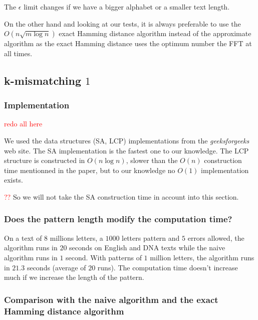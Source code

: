 \documentclass[preprint,12pt]{elsarticle}
\begin{document}
The $\epsilon$ limit changes if we have a bigger alphabet or a smaller text length.

On the other hand and looking at our tests,
it is always preferable to use the $O(n \sqrt{m \log n})$ exact Hamming distance algorithm
instead of the approximate algorithm as the exact Hamming distance uses the optimum number the FFT at all times.







\subsection{k-mismatching $1$}

\subsubsection*{Implementation}

\textcolor{red}{redo all here}

We used the data structures (SA, LCP) implementations from the \textit{geeksforgeeks} \cite{geek} web site.
The SA implementation is the fastest one to our knowledge. %
The LCP structure is constructed in $O(n \log n)$,
slower than the $O(n)$ construction time mentionned in the paper,
but to our knowledge no $O(1)$ implementation exists.

\textcolor{red}{??}
So we will not take the SA construction time in account into this section.

\subsubsection*{Does the pattern length modify the computation time?}

On  a text of $8$ millions letters, a $1 000$ letters pattern and $5$ errors allowed,
the algorithm runs in $20$ seconds on English and DNA texts while the naive algorithm runs in $1$ second.
With patterns of $1$ million letters, the algorithm runs in $21.3$ seconds (average of $20$ runs).
The computation time doesn't increase much if we increase the length of the pattern.



\subsubsection*{Comparison with the naive algorithm and the exact Hamming distance algorithm}
\end{document}

